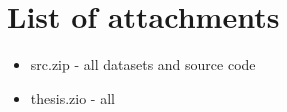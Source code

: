 \chapter{List of attachments}
\begin{itemize}
    \item src.zip - all datasets and source code
    \item thesis.zio - all 
\end{itemize}